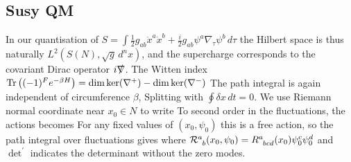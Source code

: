 \documentclass{article}
\begin{document}
\subsection{Susy QM}
In our quantisation of $S = \int \frac{1}{2} g_{ab} \dot{x}^a \dot{x}^b + \frac{i}{2} g_{ab} \psi^a \nabla_\tau \psi^b \, d\tau$
the Hilbert space is thus naturally $L^2(S(N),\sqrt{g} \, d^n x)$, and the supercharge 
corresponds to the covariant Dirac operator $i \slashed{\nabla}$. The Witten index $\operatorname{Tr} \left( (-1)^F e^{-\beta H} \right) = \dim \ker (\nabla^+) - \dim \ker (\nabla^-)$
The path integral is again independent of circumference $\beta$, Splitting 
with $\oint \delta x \, dt = 0$. We use Riemann normal coordinate near $x_0 \in N$ to write 
To second order in the fluctuations, the actions becomes 
For any fixed values of $(x_0,\psi_0)$ this is a free action, so the path integral over fluctuations gives 
where $\mc{R}\indices{^a_b}(x_0,\psi_0) = R\indices{^a_b_c_d}(x_0) \psi_0^c \psi_0^d$ and $\det^\prime$ indicates the determinant without the zero modes. 
\end{document}
